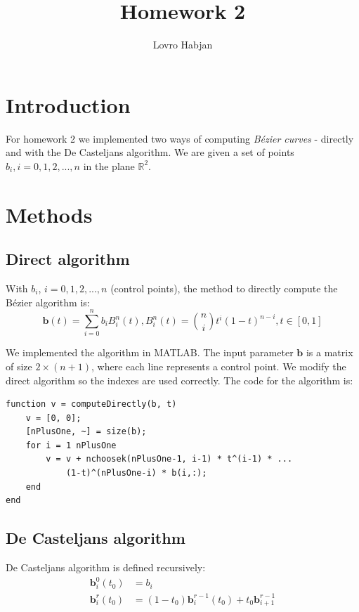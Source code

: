 \documentclass[]{article}
\title{Homework 2}
\author{Lovro Habjan}
\begin{document}
\maketitle


\section{Introduction}

For homework 2 we implemented two ways of computing \textit{B\'ezier curves} - directly and with the De Casteljans algorithm. We are given a set of points $b_i, i = 0, 1, 2, ..., n$ in the plane $\mathbb{R}^2$.


\section{Methods}

\subsection{Direct algorithm}

With $b_i$,  $i = 0, 1, 2, ..., n$ (control points), the method to directly compute the B\'ezier algorithm is:
\begin{equation*}
	\textbf{b}(t) = \sum_{i = 0}^{n} b_i B^n_i (t), B^n_i(t) = \binom{n}{i} t^i (1-t)^{n-i}, t \in [0, 1]
\end{equation*}

We implemented the algorithm in MATLAB. The input parameter $\textbf{b}$ is a matrix of size $2 \times (n + 1)$, where each line represents a control point. We modify the direct algorithm so the indexes are used correctly. The code for the algorithm is:
\begin{lstlisting}
function v = computeDirectly(b, t)
    v = [0, 0];
    [nPlusOne, ~] = size(b);
    for i = 1 nPlusOne
        v = v + nchoosek(nPlusOne-1, i-1) * t^(i-1) * ...
            (1-t)^(nPlusOne-i) * b(i,:);
    end
end
\end{lstlisting}

\subsection{De Casteljans algorithm}

De Casteljans algorithm is defined recursively:
\begin{align*}
	\textbf{b}^0_i(t_0) &= b_i \\
	\textbf{b}^r_i(t_0) &= (1 - t_0) \textbf{b}^{r-1}_i(t_0) + t_0 \textbf{b}^{r-1}_{i+1}
\end{align*}
\end{document}
